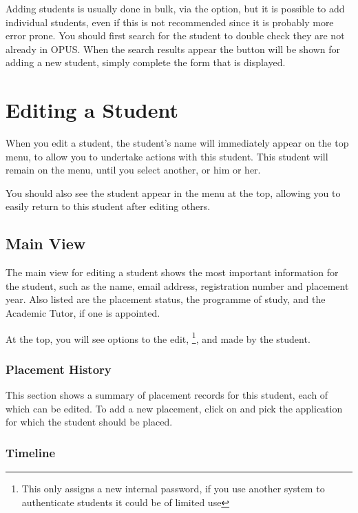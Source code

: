 \documentclass[12 pt]{book}
\begin{document}
Adding students is usually done in bulk, via the  option,
but it is possible to add individual students, even if this is not recommended
since it is probably more error prone. You should first search for the student
to double check they are not already in OPUS. When the search results appear
the  button will be shown for adding a new student, simply complete
the form that is displayed.

\section{Editing a Student}

When you edit a student, the student's name will immediately appear on the 
top menu, to allow you to undertake actions with this student. This student
will remain on the menu, until you select another, or  him or her.

You should also see the student appear in the  menu at the top,
allowing you to easily return to this student after editing others.

\subsection{Main View}

The main view for editing a student shows the most important information for
the student, such as the name, email address, registration number and placement
year. Also listed are the placement status, the programme of study, and the
Academic Tutor, if one is appointed.

At the top, you will see options to  the edit, \footnote{This only assigns a new internal password, if you use
another system to authenticate students it could be of limited use}, and
 made by the student.

\subsubsection{Placement History}

This section shows a summary of placement records for this student, each of
which can be edited. To add a new placement, click on 
and pick the application for which the student should be placed.

\subsubsection{Timeline}
\end{document}
